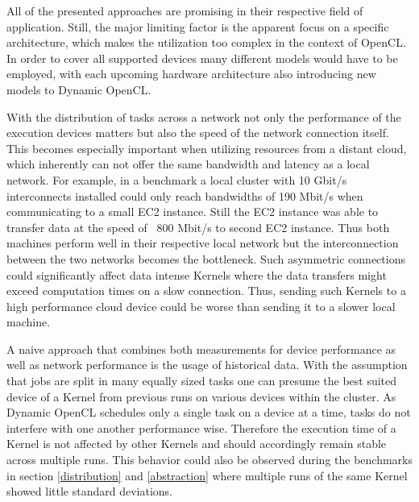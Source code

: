 All of the presented approaches are promising in their respective field of application. Still, the major limiting factor is the apparent focus on a specific architecture, which makes the utilization too complex in the context of OpenCL. In order to cover all supported devices many different models would have to be employed, with each upcoming hardware architecture also introducing new models to Dynamic OpenCL.

With the distribution of tasks across a network not only the performance of the execution devices matters but also the speed of the network connection itself. This becomes especially important when utilizing resources from a distant cloud, which inherently can not offer the same bandwidth and latency as a local network. For example, in a benchmark a local cluster with 10 Gbit/s interconnects installed could only reach bandwidths of 190 Mbit/s when communicating to a small EC2 instance. Still the EC2 instance was able to transfer data at the speed of ~800 Mbit/s to second EC2 instance. Thus both machines perform well in their respective local network but the interconnection between the two networks becomes the bottleneck. Such asymmetric connections could significantly affect data intense Kernels where the data transfers might exceed computation times on a slow connection. Thus, sending such Kernels to a high performance cloud device could be worse than sending it to a slower local machine.

A naive approach that combines both measurements for device performance as well as network performance is the usage of historical data. With the assumption that jobs are split in many equally sized tasks one can presume the best suited device of a Kernel from previous runs on various devices within the cluster. As Dynamic OpenCL schedules only a single task on a device at a time, tasks do not interfere with one another performance wise. Therefore the execution time of a Kernel is not affected by other Kernels and should accordingly remain stable across multiple runs. This behavior could also be observed during the benchmarks in section \ref{distribution} and \ref{abstraction} where multiple runs of the same Kernel showed little standard deviations.

